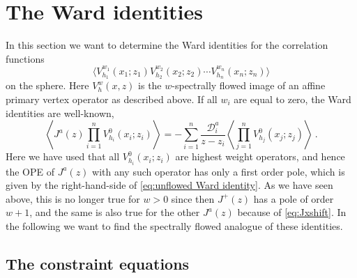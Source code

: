 \documentclass[12pt,a4paper]{article}
\newcommand{\be}{\begin{equation}}
\newcommand{\ee}{\end{equation}}
\begin{document}
\section{The Ward identities}\label{sec:Ward}

In this section we want to determine the Ward identities for the correlation functions 
\be 
\langle V_{h_1}^{w_1}(x_1;z_1)V_{h_2}^{w_2}(x_2;z_2) \cdots V_{h_n}^{w_n}(x_n;z_n) \rangle
\ee
on the sphere. Here $V_{h}^{w}(x,z)$ is the $w$-spectrally flowed image of an affine primary vertex operator as described above. If all $w_i$ are equal to zero, the Ward identities are well-known, 
\be 
\left\langle J^a(z)\prod_{i=1}^n V_{h_i}^{0}(x_i;z_i) \right\rangle=-\sum_{i=1}^{n} \frac{\mathcal{D}^a_i}{z-z_i} \left\langle \prod_{j=1}^n V_{h_j}^{0}(x_j;z_j) \right\rangle\ . \label{eq:unflowed Ward identity}
\ee
Here we have used that all $V_{h_i}^{0}(x_i;z_i)$ are highest weight operators, and hence the OPE of $J^a(z)$ with any such operator has only a first order pole, which is given by the right-hand-side of \eqref{eq:unflowed Ward identity}. As we have seen above, this is no longer true for $w>0$ since then $J^+(z)$ has a pole of order $w+1$, and the same is also true for the other $J^a(z)$ because of \eqref{eq:Jxshift}. 
In the following we want to find the spectrally flowed analogue of these identities. 


\subsection{The constraint equations}\label{sec:basic strategy}
\end{document}
